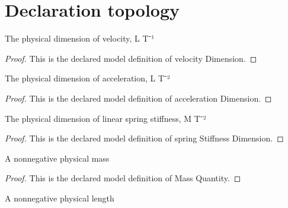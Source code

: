 \section{Declaration topology}
\begin{definition}
  \label{def:physics:phyx-mini-0718:phyxminiproblems-problemphyxmini0718-velocitydimension}
  The physical dimension of velocity, L T⁻¹
\end{definition}
\begin{proof}
  This is the declared model definition of velocity Dimension.
\end{proof}
\begin{definition}
  \label{def:physics:phyx-mini-0718:phyxminiproblems-problemphyxmini0718-accelerationdimension}
  The physical dimension of acceleration, L T⁻²
\end{definition}
\begin{proof}
  This is the declared model definition of acceleration Dimension.
\end{proof}
\begin{definition}
  \label{def:physics:phyx-mini-0718:phyxminiproblems-problemphyxmini0718-springstiffnessdimension}
  The physical dimension of linear spring stiffness, M T⁻²
\end{definition}
\begin{proof}
  This is the declared model definition of spring Stiffness Dimension.
\end{proof}
\begin{definition}
  \label{def:physics:phyx-mini-0718:phyxminiproblems-problemphyxmini0718-massquantity}
  A nonnegative physical mass
\end{definition}
\begin{proof}
  This is the declared model definition of Mass Quantity.
\end{proof}
\begin{definition}
  \label{def:physics:phyx-mini-0718:phyxminiproblems-problemphyxmini0718-lengthquantity}
  A nonnegative physical length
\end{definition}
